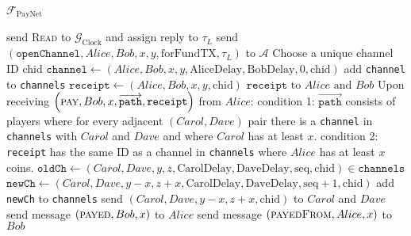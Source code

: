 \begin{functionality}{$\mathcal{F}_{\mathrm{PayNet}}$}
\begin{algorithmic}[1]
        \State send \textsc{Read} to $\mathcal{G}_{\mathrm{Clock}}$ and assign
        reply to $\tau_L$
        \State send $\left(\mathtt{openChannel}, Alice, Bob, x, y,
        \mathrm{forFundTX}, \tau_L\right)$ to $\mathcal{A}$ 
        \State Choose a unique channel ID chid
        \State $\mathtt{channel} \gets \left(Alice, Bob, x, y,
        \mathrm{AliceDelay}, \mathrm{BobDelay}, 0, \mathrm{chid}\right)$
        \State add \texttt{channel} to \texttt{channels}
        \State $\mathtt{receipt} \gets \left(Alice, Bob, x, y,
        \mathrm{chid}\right)$
        \State \Return $\mathtt{receipt} \text{ to } Alice \text{ and } Bob$
      \EndIf
    \EndIndent
    \State {}
    \State {}
    \State Upon receiving $\left(\textsc{pay}, Bob, x,
    \overrightarrow{\mathtt{path}}, \mathtt{receipt}\right)$ from $Alice$:
    \Indent
      \State condition 1: $\overrightarrow{\mathtt{path}}$ consists of players
      where for every adjacent $\left(Carol, Dave\right)$ pair there is a
      \texttt{channel} in \texttt{channels} with $Carol$ and $Dave$ and where
      $Carol$ has at least $x$.
      \State condition 2: \texttt{receipt} has the same ID as a channel in
      \texttt{channels} where $Alice$ has at least $x$ coins.
          \State $\mathtt{oldCh} \gets \left(Carol, Dave, y, z,
          \mathrm{CarolDelay}, \mathrm{DaveDelay}, \mathrm{seq},
          \mathrm{chid}\right) \in \mathtt{channels}$
          \State $\mathtt{newCh} \gets \left(Carol, Dave, y - x, z + x,
          \mathrm{CarolDelay}, \mathrm{DaveDelay}, \mathrm{seq} + 1,
          \mathrm{chid}\right)$
          \State add \texttt{newCh} to \texttt{channels}
          \State send $\left(Carol, Dave, y - x, z + x, \mathrm{chid}\right)$ to
          $Carol$ and $Dave$ 
        \EndFor
        \State send message $\left(\textsc{payed}, Bob, x\right)$ to $Alice$
        \State send message $\left(\textsc{payedFrom}, Alice, x\right)$ to $Bob$

\end{algorithmic}
\end{functionality}
